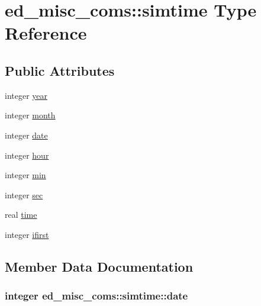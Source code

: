 \hypertarget{structed__misc__coms_1_1simtime}{}\section{ed\+\_\+misc\+\_\+coms\+:\+:simtime Type Reference}
\label{structed__misc__coms_1_1simtime}
\subsection*{Public Attributes}
\begin{DoxyCompactItemize}
\item 
integer \hyperlink{structed__misc__coms_1_1simtime_aa33c38e2a4be886fb46a0b41fc3614a9}{year}
\item 
integer \hyperlink{structed__misc__coms_1_1simtime_ab86b304a048841744f882f3d246b16b4}{month}
\item 
integer \hyperlink{structed__misc__coms_1_1simtime_a59815290d08ac367aeba85374f9fd29e}{date}
\item 
integer \hyperlink{structed__misc__coms_1_1simtime_a29ae7a915202b4505663d98424170644}{hour}
\item 
integer \hyperlink{structed__misc__coms_1_1simtime_aa6712664d87da86087d97814e6e6ac18}{min}
\item 
integer \hyperlink{structed__misc__coms_1_1simtime_ae8e8980c611067383ea98b345220a9ad}{sec}
\item 
real \hyperlink{structed__misc__coms_1_1simtime_af1edf430fdbca01a520e8d813d6f769a}{time}
\item 
integer \hyperlink{structed__misc__coms_1_1simtime_a41401a549e7e7e0b641ca1ee0e1e4664}{ifirst}
\end{DoxyCompactItemize}


\subsection{Member Data Documentation}
\hypertarget{structed__misc__coms_1_1simtime_a59815290d08ac367aeba85374f9fd29e}{}
\subsubsection[{date}]{\setlength{\rightskip}{0pt plus 5cm}integer ed\+\_\+misc\+\_\+coms\+::simtime\+::date}\label{structed__misc__coms_1_1simtime_a59815290d08ac367aeba85374f9fd29e}
\hypertarget{structed__misc__coms_1_1simtime_a29ae7a915202b4505663d98424170644}{}
